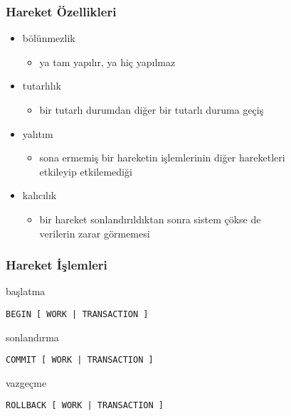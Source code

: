 \documentclass[dvipsnames]{beamer}
\theoremstyle{definition}
\theoremstyle{example}
\theoremstyle{plain}
\begin{document}
\begin{frame}
  \frametitle{Hareket Özellikleri}

  \begin{itemize}
    \item bölünmezlik
    \begin{itemize}
      \item ya tam yapılır, ya hiç yapılmaz
    \end{itemize}

    \pause
    \item tutarlılık
    \begin{itemize}
      \item bir tutarlı durumdan diğer bir tutarlı duruma geçiş
    \end{itemize}

    \pause
    \item yalıtım
    \begin{itemize}
      \item sona ermemiş bir hareketin işlemlerinin diğer hareketleri\\
        etkileyip etkilemediği
    \end{itemize}

    \pause
    \item kalıcılık
    \begin{itemize}
      \item bir hareket sonlandırıldıktan sonra sistem çökse de\\
        verilerin zarar görmemesi
    \end{itemize}
  \end{itemize}
\end{frame}

\begin{frame}[fragile]
  \frametitle{Hareket İşlemleri}

  \begin{block}{başlatma}
    \begin{lstlisting}
BEGIN [ WORK | TRANSACTION ]
    \end{lstlisting}
  \end{block}

  \pause
  \begin{block}{sonlandırma}
    \begin{lstlisting}
COMMIT [ WORK | TRANSACTION ]
    \end{lstlisting}
  \end{block}

  \pause
  \begin{block}{vazgeçme}
    \begin{lstlisting}
ROLLBACK [ WORK | TRANSACTION ]
    \end{lstlisting}
  \end{block}
\end{frame}
\end{document}
